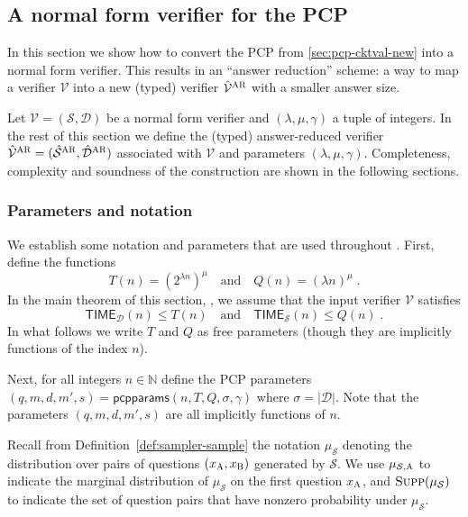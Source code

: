 \documentclass[11pt]{article}
\theoremstyle{definition}
\newcommand{\N}{\ensuremath{\mathbb{N}}}
\newcommand{\supp}{\textsc{Supp}}
\newcommand{\sampler}{\mathcal{S}}
\newcommand{\decider}{\mathcal{D}}
\newcommand{\verifier}{\mathcal{V}}
\newcommand{\gamestyle}[1]{\ensuremath{\textsc{#1}}\xspace}
\newcommand{\ar}{\gamestyle{AR}}
\newcommand{\labelstyle}[1]{\ensuremath{\textsc{#1}}\xspace}
\newcommand{\alice}{\labelstyle{A}}
\newcommand{\bob}{\labelstyle{B}}
\newcommand{\pcpparams}{\mathsf{pcpparams}}
\newcommand{\TIME}{\mathsf{TIME}}
\newcommand{\qlen}{Q}
\begin{document}
\subsection{A normal form verifier for the PCP}
\label{sec:ld-compiler}

\def\tvans{\hat{\verifier}^\ar}
\def\tsans{\hat{\sampler}^\ar}
\def\tdans{\hat{\decider}^\ar}
\def\vans{\verifier^\ar}
\def\sans{\sampler^\ar}
\def\dans{\decider^\ar}

In this section we show how to convert the PCP from \cref{sec:pcp-cktval-new}
into a normal form verifier.
This results in an ``answer reduction'' scheme: a way to map a verifier
$\verifier$ into a new (typed) verifier $\tvans$ with a smaller answer size.
	
Let $\verifier = (\sampler, \decider)$ be a normal form verifier and
$(\lambda,\mu,\gamma)$ a tuple of integers.
In the rest of this section we define the (typed) answer-reduced verifier $\tvans =
(\tsans, \tdans)$ associated with $\verifier$ and parameters $(\lambda, \mu, \gamma)$.
Completeness, complexity and soundness of the construction are shown in the
following sections.

\subsubsection{Parameters and notation}\label{sec:ar-params}
We establish some notation and parameters that are used throughout . 
First, define the functions
\begin{equation}
  \label{eq:ar-params-1}
  T(n)=(2^{\lambda n})^\mu \quad\text{and} \quad \qlen(n) = (\lambda n)^{\mu}\;.
\end{equation} 
In the main theorem of this section, , we assume that the input
verifier $\verifier$ satisfies
\begin{equation}
  \label{eq:ar-time-assumption}
  \TIME_\decider(n) \leq T(n)\quad
  \text{and}\quad \TIME_\sampler(n) \leq Q(n) \;.
\end{equation}
In what follows we write $T$ and $Q$ as free parameters (though they are
implicitly functions of the index $n$).

Next, for all integers $n \in \N$ define the PCP parameters $(q,m,d,m',s) =
\pcpparams(n, T, \qlen, \sigma, \gamma)$ where $\sigma = |\decider|$.
Note that the parameters $(q,m,d,m',s)$ are all implicitly functions of $n$.





Recall from Definition~\ref{def:sampler-sample} the notation $\mu_{\sampler}$
denoting the distribution over pairs of questions $(x_\alice,x_\bob)$ generated by
$\sampler$.
We use $\mu_{\sampler, \alice}$ to indicate the marginal distribution of
$\mu_\sampler$ on the first question $x_\alice$, and $\supp(\mu_{\sampler})$ to
indicate the set of question pairs that have nonzero probability under
$\mu_\sampler$.
\end{document}
